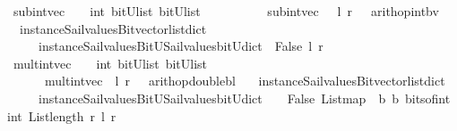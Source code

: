 \begin{isabellebody}
\isanewline
{}\isamarkupfalse%
\ sub{\isacharunderscore}int{\isacharunderscore}vec\ \ {\isacharcolon}{\isacharcolon}\ {\isachardoublequoteopen}\ int\ {\isasymRightarrow}{\isacharparenleft}bitU{\isacharparenright}list\ {\isasymRightarrow}{\isacharparenleft}bitU{\isacharparenright}list\ {\isachardoublequoteclose}\ \ \ \isanewline
\ \ \ \ \ {\isachardoublequoteopen}\ sub{\isacharunderscore}int{\isacharunderscore}vec\ \ \ l\ r\ {\isacharequal}\ {\isacharparenleft}\ arith{\isacharunderscore}op{\isacharunderscore}int{\isacharunderscore}bv\ \isanewline
\ \ {\isacharparenleft}instance{\isacharunderscore}Sail{}{\isacharunderscore}values{\isacharunderscore}Bitvector{\isacharunderscore}list{\isacharunderscore}dict\isanewline
\ \ \ \ \ instance{\isacharunderscore}Sail{}{\isacharunderscore}values{\isacharunderscore}BitU{\isacharunderscore}Sail{}{\isacharunderscore}values{\isacharunderscore}bitU{\isacharunderscore}dict{\isacharparenright}\ {\isacharparenleft}{\isacharminus}{\isacharparenright}\ False\ l\ r\ {\isacharparenright}{\isachardoublequoteclose}\isanewline
\isanewline
{}\isamarkupfalse%
\ mult{\isacharunderscore}int{\isacharunderscore}vec\ \ {\isacharcolon}{\isacharcolon}\ {\isachardoublequoteopen}\ int\ {\isasymRightarrow}{\isacharparenleft}bitU{\isacharparenright}list\ {\isasymRightarrow}{\isacharparenleft}bitU{\isacharparenright}list\ {\isachardoublequoteclose}\ \ \ \isanewline
\ \ \ \ \ {\isachardoublequoteopen}\ mult{\isacharunderscore}int{\isacharunderscore}vec\ \ l\ r\ {\isacharequal}\ {\isacharparenleft}\ arith{\isacharunderscore}op{\isacharunderscore}double{\isacharunderscore}bl\ \isanewline
\ \ {\isacharparenleft}instance{\isacharunderscore}Sail{}{\isacharunderscore}values{\isacharunderscore}Bitvector{\isacharunderscore}list{\isacharunderscore}dict\isanewline
\ \ \ \ \ instance{\isacharunderscore}Sail{}{\isacharunderscore}values{\isacharunderscore}BitU{\isacharunderscore}Sail{}{\isacharunderscore}values{\isacharunderscore}bitU{\isacharunderscore}dict{\isacharparenright}\ {\isacharparenleft}\ {\isacharasterisk}\ {\isacharparenright}\ False\ {\isacharparenleft}List{\isachardot}map\ {\isacharparenleft}{\isasymlambda}\ b{\isachardot}\ b{\isacharparenright}\ {\isacharparenleft}bits{\isacharunderscore}of{\isacharunderscore}int\ {\isacharparenleft}int\ {\isacharparenleft}List{\isachardot}length\ r{\isacharparenright}{\isacharparenright}\ l{\isacharparenright}{\isacharparenright}\ r\ {\isacharparenright}{\isachardoublequoteclose}\isanewline

\end{isabellebody}

